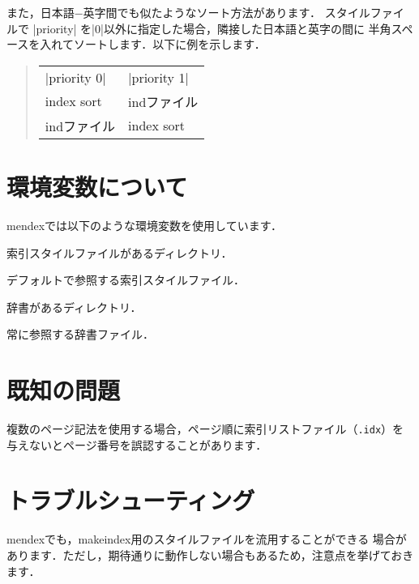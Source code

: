 \documentclass[a4paper,dvipdfmx]{jsarticle}
\newcommand{\SoftName}[1]{\textsf{#1}}
\newcommand{\FileExtension}[1]{\texttt{.#1}}
\begin{document}
また，日本語−英字間でも似たようなソート方法があります．
スタイルファイルで |priority| を|0|以外に指定した場合，隣接した日本語と英字の間に
半角スペースを入れてソートします．以下に例を示します．
%
\begin{quote}
\begin{tabular}{ll}
|priority 0| & |priority 1| \\
index sort & indファイル \\
indファイル & index sort
\end{tabular}
\end{quote}

\section{環境変数について}

\SoftName{mendex}では以下のような環境変数を使用しています．

\begin{description}[leftmargin=5cm]
\item[|INDEXSTYLE|]
索引スタイルファイルがあるディレクトリ．

\item[|INDEXDEFAULTSTYLE|]
デフォルトで参照する索引スタイルファイル．

\item[|INDEXDICTIONARY|]
辞書があるディレクトリ．

\item[|INDEXDEFAULTDICTIONARY|]
常に参照する辞書ファイル．
\end{description}

\section{既知の問題}
複数のページ記法を使用する場合，ページ順に索引リストファイル（\FileExtension{idx}）を
与えないとページ番号を誤認することがあります．


\section{トラブルシューティング}
\SoftName{mendex}でも，\SoftName{makeindex}用のスタイルファイルを流用することができる
場合があります．ただし，期待通りに動作しない場合もあるため，注意点を挙げておきます．
\end{document}
